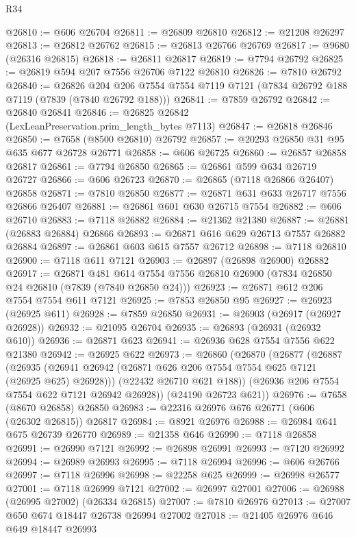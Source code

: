 \begin{lexlean}{R34}
\begin{coremodule}
@26810 := @606 @26704
@26811 := @26809 @26810
@26812 := @21208 @26297
@26813 := @26812 @26762
@26815 := @26813 @26766 @26769
@26817 := @9680 (@26316 @26815)
@26818 := @26811 @26817
@26819 := @7794 @26792
@26825 := @26819 @594 @207 @7556 @26706 @7122 @26810
@26826 := @7810 @26792
@26840 := @26826
    @204
    @206
    @7554
    @7554
    @7119
    @7121
    (@7834 @26792 @188 @7119 (@7839 (@7840 @26792 @188)))
@26841 := @7859 @26792
@26842 := @26840 @26841
@26846 := @26825 @26842 (LexLeanPreservation.prim_length_bytes @7113)
@26847 := @26818 @26846
@26850 := @7658 (@8500 @26810) @26792
@26857 := @20293 @26850 @31 @95 @635 @677 @26728 @26771
@26858 := @606 @26725
@26860 := @26857 @26858 @26817
@26861 := @7794 @26850
@26865 := @26861 @599 @634 @26719 @26727
@26866 := @606 @26723
@26870 := @26865 (@7118 @26866 @26407) @26858
@26871 := @7810 @26850
@26877 := @26871 @631 @633 @26717 @7556 @26866 @26407
@26881 := @26861 @601 @630 @26715 @7554
@26882 := @606 @26710
@26883 := @7118 @26882
@26884 := @21362 @21380
@26887 := @26881 (@26883 @26884) @26866
@26893 := @26871 @616 @629 @26713 @7557 @26882 @26884
@26897 := @26861 @603 @615 @7557 @26712
@26898 := @7118 @26810
@26900 := @7118 @611 @7121
@26903 := @26897 (@26898 @26900) @26882
@26917 := @26871
    @481
    @614
    @7554
    @7556
    @26810
    @26900
    (@7834 @26850 @24 @26810 (@7839 (@7840 @26850 @24)))
@26923 := @26871 @612 @206 @7554 @7554 @611 @7121
@26925 := @7853 @26850 @95
@26927 := @26923 (@26925 @611)
@26928 := @7859 @26850
@26931 := @26903 (@26917 (@26927 @26928))
@26932 := @21095 @26704
@26935 := @26893 (@26931 (@26932 @610))
@26936 := @26871 @623
@26941 := @26936 @628 @7554 @7556 @622 @21380
@26942 := @26925 @622
@26973 := @26860
    (@26870
      (@26877
        (@26887
          (@26935 (@26941 @26942 (@26871 @626 @206 @7554 @7554 @625 @7121 (@26925 @625) @26928)))
          (@22432 @26710 @621 @188))
        (@26936 @206 @7554 @7554 @622 @7121 @26942 @26928))
      (@24190 @26723 @621))
@26976 := @7658 (@8670 @26858) @26850
@26983 := @22316 @26976 @676 @26771 (@606 (@26302 @26815)) @26817
@26984 := @8921 @26976
@26988 := @26984 @641 @675 @26739 @26770
@26989 := @21358 @646
@26990 := @7118 @26858
@26991 := @26990 @7121
@26992 := @26898 @26991
@26993 := @7120 @26992
@26994 := @26989 @26993
@26995 := @7118 @26994
@26996 := @606 @26766
@26997 := @7118 @26996
@26998 := @22258 @625
@26999 := @26998 @26577
@27001 := @7118 @26999 @7121
@27002 := @26997 @27001
@27006 := @26988 (@26995 @27002) (@26334 @26815)
@27007 := @7810 @26976
@27013 := @27007 @650 @674 @18447 @26738 @26994 @27002
@27018 := @21405 @26976 @646 @649 @18447 @26993

\end{coremodule}
\end{lexlean}
